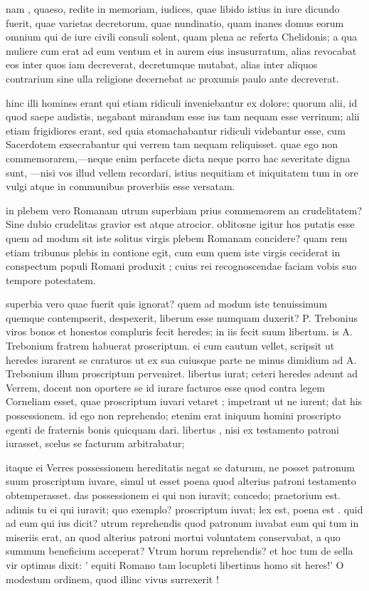  nam , quaeso, redite in memoriam, iudices, quae libido istius in iure dicundo fuerit, quae varietas decretorum, quae nundinatio, quam inanes domus eorum omnium qui de iure civili consuli solent, quam plena ac referta Chelidonis; a qua muliere cum erat ad eum ventum et in aurem eius insusurratum, alias revocabat eos inter quos iam decreverat, decretumque mutabat, alias inter aliquos contrarium sine ulla religione decernebat ac proxumis paulo ante decreverat.

 hinc illi homines erant qui etiam ridiculi inveniebantur ex dolore; quorum alii, id quod saepe audistis, negabant mirandum esse ius tam nequam esse verrinum; alii etiam frigidiores erant, sed quia stomachabantur ridiculi videbantur esse, cum Sacerdotem exsecrabantur qui verrem tam nequam reliquisset. quae ego non commemorarem,—neque enim perfacete dicta neque porro hac severitate digna sunt, —nisi vos illud vellem recordari, istius nequitiam et iniquitatem tum in ore vulgi atque in communibus proverbiis esse versatam.

 in plebem vero Romanam utrum superbiam prius commemorem an crudelitatem? Sine dubio crudelitas gravior est atque atrocior. oblitosne igitur hos putatis esse quem ad modum sit iste solitus virgis plebem Romanam concidere? quam rem etiam tribunus plebis in contione egit, cum eum quem iste virgis ceciderat in conspectum populi Romani produxit ; cuius rei recognoscendae faciam vobis suo tempore potestatem.

 superbia vero quae fuerit quis ignorat? quem ad modum iste tenuissimum quemque contempserit, despexerit, liberum esse numquam duxerit? P. Trebonius viros bonos et honestos compluris fecit heredes; in iis fecit suum libertum. is A. Trebonium fratrem habuerat proscriptum. ei cum cautum vellet, scripsit ut heredes iurarent se curaturos ut ex sua cuiusque parte ne minus dimidium ad A. Trebonium illum proscriptum perveniret. libertus iurat; ceteri heredes adeunt ad Verrem, docent non oportere se id iurare facturos esse quod contra legem Corneliam esset, quae proscriptum iuvari vetaret ; impetrant ut ne iurent; dat his possessionem. id ego non reprehendo; etenim erat iniquum homini proscripto egenti de fraternis bonis quicquam dari. libertus , nisi ex testamento patroni iurasset, scelus se facturum arbitrabatur;

 itaque ei Verres possessionem hereditatis negat se daturum, ne posset patronum suum proscriptum iuvare, simul ut esset poena quod alterius patroni testamento obtemperasset. das possessionem ei qui non iuravit; concedo; praetorium est. adimis tu ei qui iuravit; quo exemplo? proscriptum iuvat; lex est, poena est . quid ad eum qui ius dicit? utrum reprehendis quod patronum iuvabat eum qui tum in miseriis erat, an quod alterius patroni mortui voluntatem conservabat, a quo summum beneficium acceperat? Vtrum horum reprehendis? et hoc tum de sella vir optimus dixit: ' equiti Romano tam locupleti libertinus homo sit heres!' O modestum ordinem, quod illinc vivus surrexerit !

